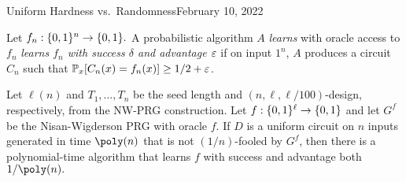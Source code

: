 \begin{lecture}{4}{Uniform Hardness vs.\ Randomness}{February 10, 2022}

\begin{definition}
  Let $f_n : \{0, 1\}^n \to \{0, 1\}.$ A probabilistic algorithm $A$
  \emph{learns} with oracle access to $f_n$ \emph{learns $f_n$ with success
  $\delta$ and advantage $\varepsilon$} if on input $1^n$, $A$ produces a circuit
  $C_n$ such that $\mathbb{P}_x [C_n(x) = f_n(x)] \geq 1/2 + \varepsilon$.
\end{definition}

\begin{proposition}
  Let $\ell(n)$ and $T_1, \dots, T_n$ be the seed length and $(n, \ell,
  \ell/100)$-design, respectively, from the NW-PRG construction. Let $f :
  \{0,1\}^\ell \to \{0, 1\}$ and let $G^f$ be the Nisan-Wigderson PRG with
  oracle $f$. If $D$ is a uniform circuit on $n$ inputs generated in time
  $\poly(n)$ that is not $(1/n)$-fooled by $G^f$, then there is a
  polynomial-time algorithm that learns $f$ with success and advantage both
  $1/\poly(n).$
\end{proposition}


\end{lecture}
